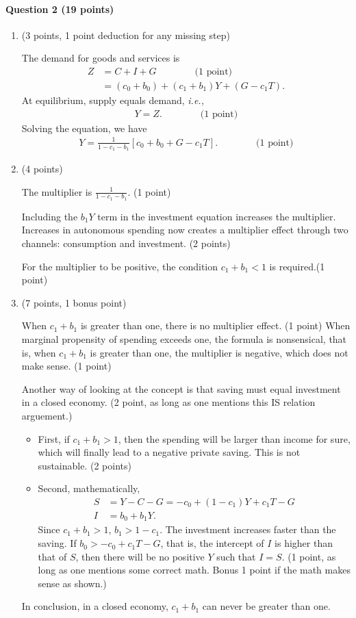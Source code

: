 \documentclass[12pt]{article}
\begin{document}
\paragraph{Question 2 (19 points)}
\begin{enumerate}[label=\alph*.]
	\item (3 points, 1 point deduction for any missing step)
	
	The demand for goods and services is
	\begin{align*}
		Z &= C + I + G \qquad\qquad \text{(1 point)}\\
		&= (c_0 + b_0) + (c_1 + b_1)Y + (G - c_1 T).
	\end{align*}
	At equilibrium, supply equals demand, \textit{i.e.,}
	\begin{align*}
		Y = Z. \qquad\qquad \text{(1 point)}
	\end{align*}
	Solving the equation, we have
	\begin{align*}
		Y = \frac{1}{1-c_1-b_1}[c_0 + b_0 + G - c_1T]. \qquad\qquad \text{(1 point)}
	\end{align*}
	\item (4 points)
	
	The multiplier is $\frac{1}{1-c_1-b_1}$. (1 point)
	
	Including the $b_1Y$ term in the investment equation increases the multiplier. Increases in autonomous spending now creates a multiplier effect through two channels: consumption and investment. (2 points) 
	
	For the multiplier to be positive, the condition $c_1 + b_1 < 1$ is required.(1 point)
	\item (7 points, 1 bonus point)
	
	When $c_1 + b_1$ is greater than one, there is no multiplier effect. (1 point) When marginal propensity of spending exceeds one, the formula is nonsensical, that is, when $c_1 + b_1$ is greater than one, the multiplier is negative, which does not make sense. (1 point) 
	
	Another way of looking at the concept is that saving must equal investment in a closed economy. (2 point, as long as one mentions this IS relation arguement.)
	\begin{itemize}
		\item First, if $c_1 + b_1 > 1$, then the spending will be larger than income for sure, which will finally lead to a negative private saving. This is not sustainable. (2 points)
		\item Second, mathematically,
		\begin{align*}
			S &= Y - C - G = -c_0 + (1-c_1)Y + c_1T - G\\
			I &= b_0 + b_1 Y.
		\end{align*}
		Since $c_1 + b_1 > 1$, $b_1 > 1-c_1$. The investment increases faster than the saving. If $b_0 > -c_0 + c_1T - G$, that is, the intercept of $I$ is higher than that of $S$, then there will be no positive $Y$ such that $I=S$. (1 point, as long as one mentions some correct math. Bonus 1 point if the math makes sense as shown.)
	\end{itemize}
	In conclusion, in a closed economy, $c_1 + b_1$ can never be greater than one. 


\end{enumerate}
\end{document}
